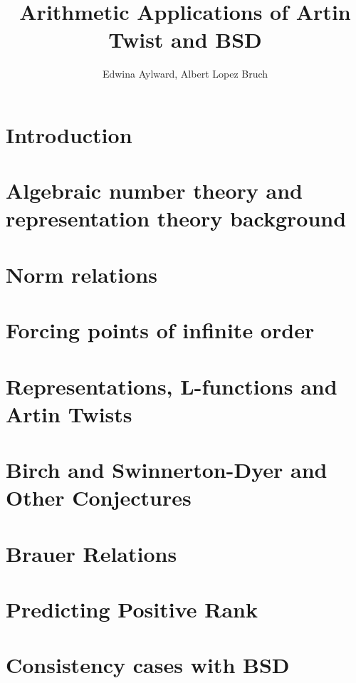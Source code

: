 \documentclass{article}
\title{Arithmetic Applications of Artin Twist and BSD}
\author{Edwina Aylward, Albert Lopez Bruch}
\theoremstyle{plain}
\theoremstyle{definition}
\begin{document}
	\maketitle
	\newpage
	\tableofcontents
	\newpage

\section*{Introduction}


\section{Algebraic number theory and representation theory background}



\newpage
\section{Norm relations}



\newpage
\section{Forcing points of infinite order}



\newpage
\section{Representations, L-functions and Artin Twists}


\section{Birch and Swinnerton-Dyer and Other Conjectures}


\section{Brauer Relations}


\section{Predicting Positive Rank}


\section{Consistency cases with BSD}





\newpage



\end{document}
